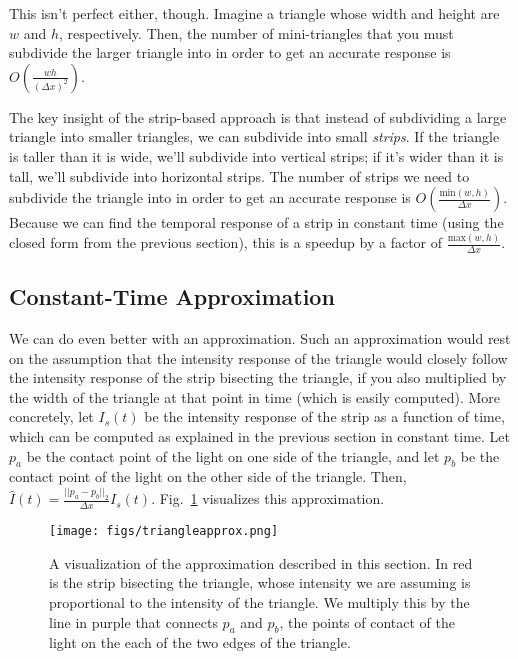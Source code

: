\documentclass[11pt]{article}
\begin{document}
This isn't perfect either, though. Imagine a triangle whose width and height are $w$ and $h$, respectively. Then, the number of mini-triangles that you must subdivide the larger triangle into in order to get an accurate response is $O(\frac{wh}{(\Delta x)^2})$. 

The key insight of the strip-based approach is that instead of subdividing a large triangle into smaller triangles, we can subdivide into small \emph{strips}. If the triangle is taller than it is wide, we'll subdivide into vertical strips; if it's wider than it is tall, we'll subdivide into horizontal strips. The number of strips we need to subdivide the triangle into in order to get an accurate response is $O(\frac{\mathrm{min}(w, h)}{\Delta x})$. Because we can find the temporal response of a strip in constant time (using the closed form from the previous section), this is a speedup by a factor of $\frac{\mathrm{max}(w, h)}{\Delta x}$.

\subsection{Constant-Time Approximation}

We can do even better with an approximation. Such an approximation would rest on the assumption that the intensity response of the triangle would closely follow the intensity response of the strip bisecting the triangle, if you also multiplied by the width of the triangle at that point in time (which is easily computed). More concretely, let $I_s(t)$ be the intensity response of the strip as a function of time, which can be computed as explained in the previous section in constant time. Let $p_a$ be the contact point of the light on one side of the triangle, and let $p_b$ be the contact point of the light on the other side of the triangle. Then, $\hat{I}(t) = \frac{||p_a - p_b||_2}{\Delta x} I_s(t)$. Fig.~\ref{fig:triangleapprox} visualizes this approximation.

\begin{figure}
\begin{center}
\centering
\texttt{[image: figs/triangleapprox.png]}
\caption{A visualization of the approximation described in this section. In red is the strip bisecting the triangle, whose intensity we are assuming is proportional to the intensity of the triangle. We multiply this by the line in purple that connects $p_a$ and $p_b$, the points of contact of the light on the each of the two edges of the triangle. \label{fig:triangleapprox}}
\end{center}
\end{figure}
\end{document}
